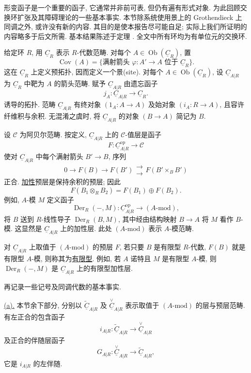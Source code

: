 形变函子是一个重要的函子, 它通常并非前可表, 但仍有遍有形式对象.
为此回顾交换环扩张及其障碍理论的一些基本事实.
本节除系统使用景上的 Grothendieck 上同调之外, 或许没有新的内容.
其目的是使本报告尽可能自足; 实际上我们所证明的内容略多于后文所需.
基本结果陈述于定理 .
全文中所有环均为有单位元的交换环.


给定环 $R$, 用 $\underline C_R$ 表示 $R$-代数范畴.
对每个 $A\in\operatorname{Ob}(\underline C_R)$, 置
\[
 \operatorname{Cov}(A)=
 \{\text{满射箭头 }\varphi:A'\longrightarrow A
   \text{ 位于 }\underline C_R\}.
\]
这在 $\underline C_R$ 上定义预拓扑, 因而定义一个景(site).
对每个 $A\in\operatorname{Ob}(\underline C_R)$,
设 $\underline C_{A|R}$ 为 $\underline C_R$ 中靶为 $A$ 的箭头范畴.
赋予 $\underline C_{A|R}$ 由遗忘函子
\[
 j_A:\underline C_{A|R}\longrightarrow\underline C_R.
\]
诱导的拓扑. 范畴 $\underline C_{A|R}$ 有终对象
$(1_A:A\longrightarrow A)$ 及始对象 $(i_A:R\longrightarrow A)$,
且容许纤维积与余积.
无混淆之虞时, 将 $\underline C_{A|R}$ 的对象 $(B\longrightarrow A)$ 简记为 $B$.

设 $\mathscr C$ 为阿贝尔范畴.
按定义, $\underline C_{A|R}$ 上的 $\mathscr C$-值层是函子
\[
 F:\underline C_{A|R}^{\mathrm{op}}\longrightarrow\mathscr C
\]
使对 $\underline C_{A|R}$ 中每个满射箭头 $B'\longrightarrow B$, 序列
\[
 0\longrightarrow F(B)\longrightarrow F(B')
 \mathrel{\substack{\longrightarrow\\[-.6ex]\longrightarrow}}
 F(B'\mathbin{\times_B}B')
\]
正合. \underline{加性}预层是保持余积的预层; 因此
\[
 F(B_1\otimes_R B_2)=F(B_1)\oplus F(B_2).
\]
例如, $A$-模 $M$ 定义函子
\[
 \operatorname{Der}_R(-,M):
 \underline C_{A|R}^{\mathrm{op}}\longrightarrow(A\text{-mod}),
\]
将 $B$ 送到 $R$-线性导子 $\operatorname{Der}_R(B,M)$,
其中经由结构映射 $B\longrightarrow A$ 将 $M$ 看作 $B$-模.
这显然是 $\underline C_{A|R}$ 上的加性层.
此处 $(A\text{-mod})$ 表示 $A$-模范畴.

对 $\underline C_{A|R}$ 上取值于 $(A\text{-mod})$ 的预层 $F$,
若只要 $B$ 是有限型 $R$-代数, $F(B)$ 就是有限型 $A$-模,
则称其为\underline{有限型}.
例如, 若 $A$ 诺特且 $M$ 是有限型 $A$-模,
则 $\operatorname{Der}_R(-,M)$ 是 $\underline C_{A|R}$ 上的有限型加性层.

再记录一些记号及同调代数的基本事实.

\underline{(a).}
本节余下部分, 分别以 $\widetilde{\underline C}_{A|R}$ 及
$\overset{\vee}{\underline C}_{A|R}$ 表示取值于 $(A\text{-mod})$ 的层与预层范畴.
有左正合的包含函子
\[
 i_{A|R}:\widetilde{\underline C}_{A|R}
 \longrightarrow\overset{\vee}{\underline C}_{A|R}
\]
及正合的伴随层函子
\[
 G_{A|R}:\overset{\vee}{\underline C}_{A|R}
 \longrightarrow\widetilde{\underline C}_{A|R},
\]
它是 $i_{A|R}$ 的左伴随.


